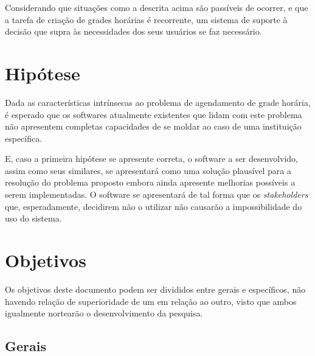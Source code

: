     Considerando que situações como a descrita acima são passíveis de ocorrer, e que a tarefa de criação de grades horárias é recorrente, um sistema de suporte à decisão que supra às necessidades dos seus usuários se faz necessário.

\section{Hipótese} %

    Dada as características intrínsecas ao problema de agendamento de grade horária, é esperado que os softwares atualmente existentes que lidam com este problema não apresentem completas capacidades de se moldar ao caso de uma instituição específica.

    E, caso a primeira hipótese se apresente correta, o software a ser desenvolvido, assim como seus similares, se apresentará como uma solução plausível para a resolução do problema proposto embora ainda apresente melhorias possíveis a serem implementadas. O software se apresentará de tal forma que os \textit{stakeholders} que, esperadamente, decidirem não o utilizar não causarão a impossibilidade do uso do sistema.


\section{Objetivos} %

    Os objetivos deste documento podem ser divididos entre gerais e específicos, não havendo relação de superioridade de um em relação ao outro, visto que ambos igualmente nortearão o desenvolvimento da pesquisa.

    \subsection{Gerais} %


